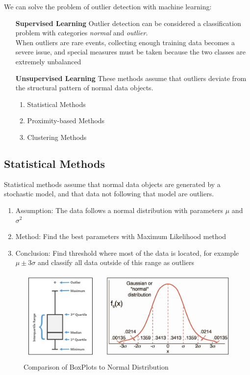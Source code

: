 \documentclass[11pt]{article}
\begin{document}
We can solve the problem of outlier detection with machine learning:

\begin{itemize}[leftmargin=*, labelindent=5cm, labelsep=0.5cm]
    \item[\textbf{Supervised Learning}] Outlier detection can be considered a classification problem with categories \emph{normal} and \emph{outlier}.\\
          When outliers are rare events, collecting enough training data becomes a severe issue, and special measures must be taken because the two classes are extremely unbalanced
    \item[\textbf{Unsupervised Learning}] These methods assume that outliers deviate from the structural pattern of normal data objects.
          \begin{enumerate}
              \item Statistical Methods
              \item Proximity-based Methods
              \item Clustering Methods
          \end{enumerate}
\end{itemize}

\subsection{Statistical Methods}
Statistical methods assume that normal data objects are generated by a stochastic model, and that data not following that model are outliers.

\begin{enumerate}
    \item Assumption: The data follows a normal distribution with parameters $\mu$ and $\sigma^2$
    \item Method: Find the best parameters with Maximum Likelihood method
    \item Conclusion: Find threshold where most of the data is located, for example $\mu \pm 3\sigma$ and classify all data outside of this range as outliers
\end{enumerate}

\begin{figure}[tbh!]
    \centering
    \includegraphics[width=0.8\linewidth, keepaspectratio]{Pictures/outlier_boxplot}
    \caption{Comparison of BoxPlots to Normal Distribution}
    \label{fig:outlierboxplot}
\end{figure}
\end{document}
